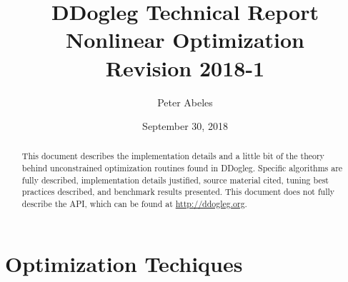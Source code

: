 \documentclass[peerreview,compsoc,onecolumn]{IEEEtran}
\begin{document}
\title{DDogleg Technical Report\\ Nonlinear Optimization\\{\Large Revision 2018-1}}


\author{Peter Abeles}
\date{September 30, 2018}

\maketitle
\tableofcontents
\listoffigures
\listoftables

\IEEEpeerreviewmaketitle
\begin{abstract}
This document describes the implementation details and a little bit of the theory behind unconstrained optimization routines found in DDogleg. Specific algorithms are fully described, implementation details justified, source material cited, tuning best practices described, and benchmark results presented. This document does not fully describe the API, which can be found at \url{http://ddogleg.org}.
\end{abstract}


\section{Optimization Techiques}
\end{document}

